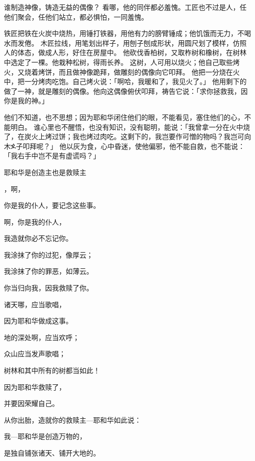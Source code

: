 {谁制造神像，铸造无益的偶像？
看哪，他的同伴都必羞愧。工匠也不过是人，任他们聚会，任他们站立，都必惧怕，一同羞愧。
\par }{\PP {}铁匠把铁在火炭中烧热，用锤打铁器，用他有力的膀臂锤成；他饥饿而无力，不喝水而发倦。
木匠拉线，用笔划出样子，用刨子刨成形状，用圆尺划了模样，仿照人的体态，做成人形，好住在房屋中。
他砍伐香柏树，又取柞树和橡树，在树林中选定了一棵。他栽种松树，得雨长养。
这树，人可用以烧火；他自己取些烤火，又烧着烤饼，而且做神像跪拜，做雕刻的偶像向它叩拜。
他把一分烧在火中，把一分烤肉吃饱。自己烤火说：「啊哈，我暖和了，我见火了。」
他用剩下的做了一神，就是雕刻的偶像。他向这偶像俯伏叩拜，祷告它说：「求你拯救我，因你是我的神。」
\par }{\PP {}他们不知道，也不思想；因为耶和华闭住他们的眼，不能看见，塞住他们的心，不能明白。
谁心里也不醒悟，也没有知识，没有聪明，能说：「我曾拿一分在火中烧了，在炭火上烤过饼；我也烤过肉吃。这剩下的，我岂要作可憎的物吗？我岂可向木ⶍ子叩拜呢？」
他以灰为食，心中昏迷，使他偏邪，他不能自救，也不能说：「我右手中岂不是有虚谎吗？」
\par }{\SH 耶和华是创造主也是救赎主
\par }{\Q {}，{}啊，
\par }{\Q 你是我的仆人，要记念这些事。
\par }{啊，你是我的仆人，
\par }{\Q 我造就你必不忘记你。
\par }{\Q {}我涂抹了你的过犯，像厚云{}；
\par }{\Q 我涂抹了你的罪恶，如薄云{}。
\par }{\Q 你当归向我，因我救赎了你。
\par }{\Q {}诸天哪，应当歌唱，
\par }{\Q 因为耶和华做成这事。
\par }{\Q 地的深处啊，应当欢呼；
\par }{\Q 众山应当发声歌唱；
\par }{\Q 树林和其中所有的树都当如此！
\par }{\Q 因为耶和华救赎了{}，
\par }{\Q 并要因{}荣耀自己。
\par }{\BB \par }{\Q {}从你出胎，造就你的救赎主—耶和华如此说：
\par }{\Q 我—耶和华是创造万物的，
\par }{\Q 是独自铺张诸天、铺开大地的。
}
